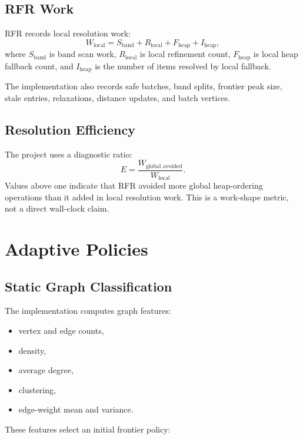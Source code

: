 \documentclass[11pt]{article}
\newcommand{\RFR}{\textsc{RFR}}
\begin{document}
\subsection{RFR Work}

\RFR{} records local resolution work:
\[
  W_{\text{local}} =
  S_{\text{band}} +
  R_{\text{local}} +
  F_{\text{heap}} +
  I_{\text{heap}},
\]
where $S_{\text{band}}$ is band scan work, $R_{\text{local}}$ is local refinement count, $F_{\text{heap}}$ is local heap fallback count, and $I_{\text{heap}}$ is the number of items resolved by local fallback.

The implementation also records safe batches, band splits, frontier peak size, stale entries, relaxations, distance updates, and batch vertices.

\subsection{Resolution Efficiency}

The project uses a diagnostic ratio:
\[
  E = \frac{W_{\text{global avoided}}}{W_{\text{local}}}.
\]
Values above one indicate that \RFR{} avoided more global heap-ordering operations than it added in local resolution work. This is a work-shape metric, not a direct wall-clock claim.

\section{Adaptive Policies}
\label{sec:adaptive}

\subsection{Static Graph Classification}

The implementation computes graph features:

\begin{itemize}
  \item vertex and edge counts,
  \item density,
  \item average degree,
  \item clustering,
  \item edge-weight mean and variance.
\end{itemize}

These features select an initial frontier policy:
\end{document}
